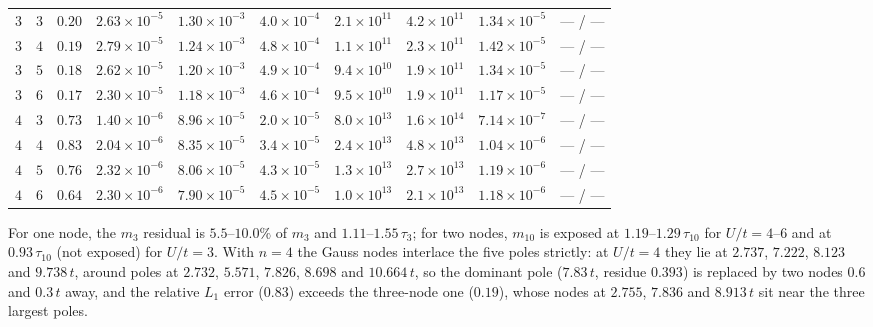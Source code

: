 \documentclass[aps,prb,onecolumn,superscriptaddress,longbibliography,floatfix]{revtex4-2}
\begin{document}
\begin{table}[htbp]
\begin{tabular}{cccccccccc}
$3$ & $3$ & $0.20$ & $2.63\times10^{-5}$ & $1.30\times10^{-3}$ & $4.0\times10^{-4}$ & $2.1\times10^{11}$ & $4.2\times10^{11}$ & $1.34\times10^{-5}$ & --- / --- \\
$3$ & $4$ & $0.19$ & $2.79\times10^{-5}$ & $1.24\times10^{-3}$ & $4.8\times10^{-4}$ & $1.1\times10^{11}$ & $2.3\times10^{11}$ & $1.42\times10^{-5}$ & --- / --- \\
$3$ & $5$ & $0.18$ & $2.62\times10^{-5}$ & $1.20\times10^{-3}$ & $4.9\times10^{-4}$ & $9.4\times10^{10}$ & $1.9\times10^{11}$ & $1.34\times10^{-5}$ & --- / --- \\
$3$ & $6$ & $0.17$ & $2.30\times10^{-5}$ & $1.18\times10^{-3}$ & $4.6\times10^{-4}$ & $9.5\times10^{10}$ & $1.9\times10^{11}$ & $1.17\times10^{-5}$ & --- / --- \\
$4$ & $3$ & $0.73$ & $1.40\times10^{-6}$ & $8.96\times10^{-5}$ & $2.0\times10^{-5}$ & $8.0\times10^{13}$ & $1.6\times10^{14}$ & $7.14\times10^{-7}$ & --- / --- \\
$4$ & $4$ & $0.83$ & $2.04\times10^{-6}$ & $8.35\times10^{-5}$ & $3.4\times10^{-5}$ & $2.4\times10^{13}$ & $4.8\times10^{13}$ & $1.04\times10^{-6}$ & --- / --- \\
$4$ & $5$ & $0.76$ & $2.32\times10^{-6}$ & $8.06\times10^{-5}$ & $4.3\times10^{-5}$ & $1.3\times10^{13}$ & $2.7\times10^{13}$ & $1.19\times10^{-6}$ & --- / --- \\
$4$ & $6$ & $0.64$ & $2.30\times10^{-6}$ & $7.90\times10^{-5}$ & $4.5\times10^{-5}$ & $1.0\times10^{13}$ & $2.1\times10^{13}$ & $1.18\times10^{-6}$ & --- / --- \\
\bottomrule
\end{tabular}
\end{table}

For one node, the $m_3$ residual is $5.5$--$10.0\%$ of $m_3$ and $1.11$--$1.55\,\tau_3$; for two nodes, $m_{10}$ is exposed at $1.19$--$1.29\,\tau_{10}$ for $U/t=4$--$6$ and at $0.93\,\tau_{10}$ (not exposed) for $U/t=3$. With $n=4$ the Gauss nodes interlace the five poles strictly: at $U/t=4$ they lie at $2.737$, $7.222$, $8.123$ and $9.738\,t$, around poles at $2.732$, $5.571$, $7.826$, $8.698$ and $10.664\,t$, so the dominant pole ($7.83\,t$, residue $0.393$) is replaced by two nodes $0.6$ and $0.3\,t$ away, and the relative $L_1$ error ($0.83$) exceeds the three-node one ($0.19$), whose nodes at $2.755$, $7.836$ and $8.913\,t$ sit near the three largest poles.
\end{document}
